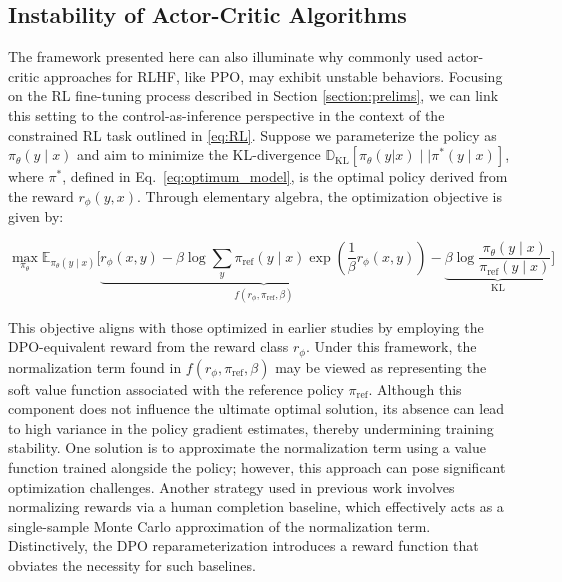 \subsection{Instability of Actor-Critic Algorithms} The framework presented here can also illuminate why commonly used actor-critic approaches for RLHF, like PPO, may exhibit unstable behaviors. Focusing on the RL fine-tuning process described in Section \ref{section:prelims}, we can link this setting to the control-as-inference perspective \cite{levine2018reinforcement} in the context of the constrained RL task outlined in \ref{eq:RL}. Suppose we parameterize the policy as $\pi_{\theta}(y\mid x)$ and aim to minimize the KL-divergence $\mathbb{D}_{\text{KL}}[\pi_{\theta}(y|x) \mid \mid \pi^*(y\mid x)]$, where $\pi^*$, defined in Eq.~\ref{eq:optimum_model}, is the optimal policy derived from the reward $r_{\phi}(y, x)$. Through elementary algebra, the optimization objective is given by:

\begin{equation}\label{eq:AC}
    \max_{\pi_{\theta}}\mathbb{E}_{\pi_{\theta}(y\mid x)}\bigg[\underbrace{r_{\phi}(x, y) -\beta\log\sum_{y}\pi_\text{ref}(y\mid x)\exp\left(\frac{1}{\beta}r_{\phi}(x, y)\right)}_{f(r_{\phi}, \pi_\text{ref}, \beta)} - \underbrace{\beta\log\frac{\pi_{\theta}(y\mid x)}{\pi_\text{ref}(y\mid x)}}_{\text{KL}}\bigg]
\end{equation}

This objective aligns with those optimized in earlier studies 
\citep{ziegler2020finetuning, stiennon2022learning, bai2022training, ouyang2022training} by employing the DPO-equivalent reward from the reward class $r_{\phi}$. Under this framework, the normalization term found in $f(r_{\phi}, \pi_\text{ref}, \beta)$ may be viewed as representing the soft value function associated with the reference policy $\pi_\text{ref}$. Although this component does not influence the ultimate optimal solution, its absence can lead to high variance in the policy gradient estimates, thereby undermining training stability. One solution is to approximate the normalization term using a value function trained alongside the policy; however, this approach can pose significant optimization challenges. Another strategy used in previous work involves normalizing rewards via a human completion baseline, which effectively acts as a single-sample Monte Carlo approximation of the normalization term. Distinctively, the DPO reparameterization introduces a reward function that obviates the necessity for such baselines.

